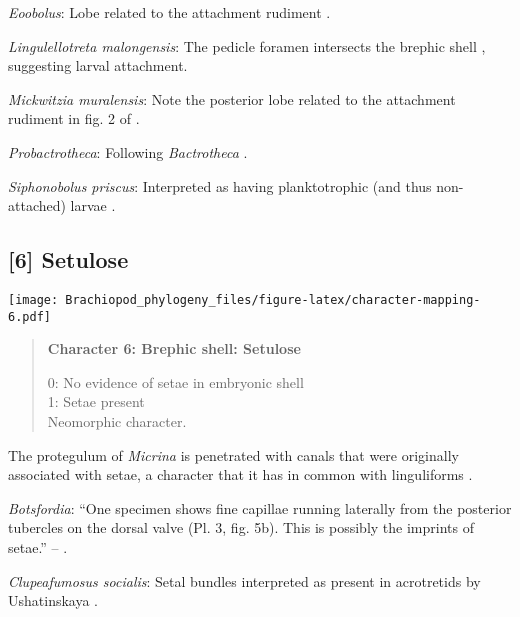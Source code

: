\documentclass[openany]{book}
\theoremstyle{definition}
\theoremstyle{definition}
\theoremstyle{definition}
\theoremstyle{remark}
\begin{document}
\hypertarget{Eoobolus-coding-5}{}
\emph{Eoobolus}: Lobe related to the attachment rudiment \citep[fig.
2]{Balthasar2009Thebrachiopod}.

\hypertarget{Lingulellotreta_malongensis-coding-5}{}
\emph{Lingulellotreta malongensis}: The pedicle foramen intersects the
brephic shell \citep{Holmer1997EarlyCambrian, Li2004}, suggesting larval
attachment.

\hypertarget{Mickwitzia_muralensis-coding-5}{}
\emph{Mickwitzia muralensis}: Note the posterior lobe related to the
attachment rudiment in fig. 2 of \citet{Balthasar2009Thebrachiopod}.

\hypertarget{Probactrotheca-coding-5}{}
\emph{Probactrotheca}: Following \emph{Bactrotheca}
\citep{Dzik1980Ontogenyof}.

\hypertarget{Siphonobolus_priscus-coding-5}{}
\emph{Siphonobolus priscus}: Interpreted as having planktotrophic (and
thus non-attached) larvae \citep{Popov2009Earlyontogeny}.

\subsection*{{[}6{]} Setulose}\label{setulose}

\texttt{[image: Brachiopod\_phylogeny\_files/figure-latex/character-mapping-6.pdf]}

\begin{quote}
\textbf{Character 6: Brephic shell: Setulose}

0: No evidence of setae in embryonic shell\\
1: Setae present\\
Neomorphic character.
\end{quote}

The protegulum of \emph{Micrina} is penetrated with canals that were
originally associated with setae, a character that it has in common with
linguliforms \citep{Holmer2011Firstrecord}.

\hypertarget{Botsfordia-coding-6}{}
\emph{Botsfordia}: ``One specimen shows fine capillae running laterally
from the posterior tubercles on the dorsal valve (Pl. 3, fig. 5b). This
is possibly the imprints of setae.'' --
\citet{Ushatinskaya2016Revisionof}.

\hypertarget{Clupeafumosus_socialis-coding-6}{}
\emph{Clupeafumosus socialis}: Setal bundles interpreted as present in
acrotretids by Ushatinskaya \citeyearpar{Ushatinskaya2016Protegulumand}.
\end{document}
